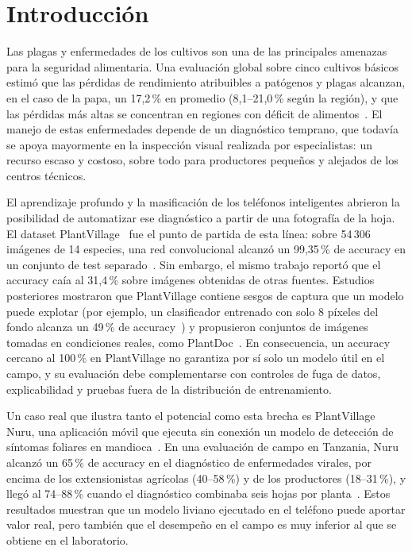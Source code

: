 \section{Introducción}
\label{sec:introduccion}

Las plagas y enfermedades de los cultivos son una de las principales amenazas para la
seguridad alimentaria. Una evaluación global sobre cinco cultivos básicos estimó que las
pérdidas de rendimiento atribuibles a patógenos y plagas alcanzan, en el caso de la papa,
un 17,2\,\% en promedio (8,1--21,0\,\% según la región), y que las pérdidas más altas se
concentran en regiones con déficit de alimentos~\cite{savary2019burden}. El manejo de estas
enfermedades depende de un diagnóstico temprano, que todavía se apoya mayormente en la
inspección visual realizada por especialistas: un recurso escaso y costoso, sobre todo para
productores pequeños y alejados de los centros técnicos.

El aprendizaje profundo y la masificación de los teléfonos inteligentes abrieron la
posibilidad de automatizar ese diagnóstico a partir de una fotografía de la hoja. El dataset
PlantVillage~\cite{hughes2015plantvillage} fue el punto de partida de esta línea: sobre
54\,306 imágenes de 14 especies, una red convolucional alcanzó un 99,35\,\% de accuracy en
un conjunto de test separado~\cite{mohanty2016using}. Sin embargo, el mismo trabajo reportó
que el accuracy caía al 31,4\,\% sobre imágenes obtenidas de otras fuentes. Estudios
posteriores mostraron que PlantVillage contiene sesgos de captura que un modelo puede
explotar (por ejemplo, un clasificador entrenado con solo 8 píxeles del fondo alcanza un
49\,\% de accuracy~\cite{noyan2022uncovering}) y propusieron conjuntos de imágenes tomadas
en condiciones reales, como PlantDoc~\cite{singh2020plantdoc}. En consecuencia, un
accuracy cercano al 100\,\% en PlantVillage no garantiza por sí solo un modelo útil en el
campo, y su evaluación debe complementarse con controles de fuga de datos, explicabilidad y
pruebas fuera de la distribución de entrenamiento.

Un caso real que ilustra tanto el potencial como esta brecha es PlantVillage Nuru, una
aplicación móvil que ejecuta sin conexión un modelo de detección de síntomas foliares en
mandioca~\cite{ramcharan2019mobile}. En una evaluación de campo en Tanzania, Nuru alcanzó un
65\,\% de accuracy en el diagnóstico de enfermedades virales, por encima de los extensionistas
agrícolas (40--58\,\%) y de los productores (18--31\,\%), y llegó al 74--88\,\% cuando el
diagnóstico combinaba seis hojas por planta~\cite{mrisho2020accuracy}. Estos resultados
muestran que un modelo liviano ejecutado en el teléfono puede aportar valor real, pero
también que el desempeño en el campo es muy inferior al que se obtiene en el laboratorio.

